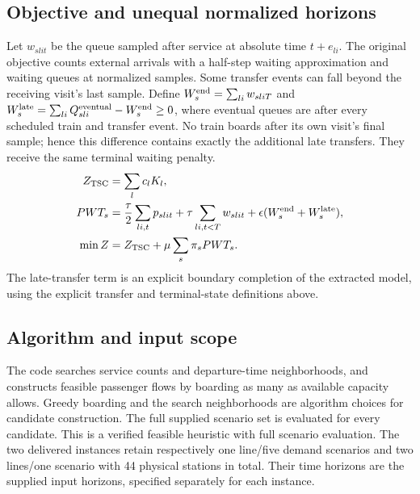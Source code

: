 \documentclass{article}
\begin{document}
\subsection*{Objective and unequal normalized horizons}
Let $w_{slit}$ be the queue sampled after service at absolute time
$t+e_{li}$. The original objective counts external arrivals with a
half-step waiting approximation and waiting queues at normalized samples.
Some transfer events can fall beyond the receiving visit's last sample.
Define $W_s^{\rm end}=\sum_{li}w_{sliT}$ and
$W_s^{\rm late}=\sum_{li}Q_{sli}^{\rm eventual}-W_s^{\rm end}\ge0$,
where eventual queues are after every scheduled train and transfer event.
No train boards after its own visit's final sample; hence this difference
contains exactly the additional late transfers. They receive the same
terminal waiting penalty.
\begin{align}
Z_{\rm TSC}&=\sum_l c_lK_l,\\
PWT_s&=\frac{\tau}{2}\sum_{li,t}p_{slit}
+\tau\sum_{li,t<T}w_{slit}
+\epsilon(W_s^{\rm end}+W_s^{\rm late}),\\
\min Z&=Z_{\rm TSC}+\mu\sum_s\pi_sPWT_s .
\end{align}
The late-transfer term is an explicit boundary completion of the
extracted model, using the explicit transfer and terminal-state definitions above.

\subsection*{Algorithm and input scope}
The code searches service counts and departure-time neighborhoods, and
constructs feasible passenger flows by boarding as many as available
capacity allows. Greedy boarding and the search neighborhoods are algorithm
choices for candidate construction. The full supplied
scenario set is evaluated for every candidate. This is a verified feasible
heuristic with full scenario evaluation. The two delivered
instances retain respectively one line/five demand scenarios and two
lines/one scenario with 44 physical stations in total. Their time horizons
are the supplied input horizons, specified separately for each instance.
\end{document}
